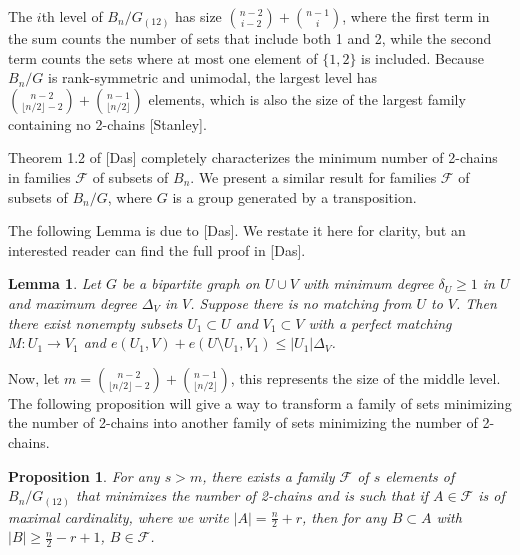 \documentclass[12pt]{article}
\theoremstyle{plain}
\newtheorem{lemma}[theorem]{Lemma}
\newtheorem{proposition}[theorem]{Proposition}
\theoremstyle{definition}
\theoremstyle{remark}
\newcommand{\F}{\mathcal{F}}
\begin{document}
The $i$th level of $B_n / G_{(12)}$ has size $\binom{n-2}{i-2} + \binom{n-1}{i}$, where the first term in the sum counts the number of sets that include both 1 and 2, while the second term counts the sets where at most one element of $\{1,2\}$ is included. Because $B_n / G$ is rank-symmetric and unimodal, the largest level has $\binom{n-2}{\lfloor n/2 \rfloor -2} + \binom{n-1}{\lfloor n/2 \rfloor}$ elements, which is also the size of the largest family containing no 2-chains [Stanley].


Theorem 1.2 of [Das] completely characterizes the minimum number of 2-chains in families $\F$ of subsets of $B_n$. We present a similar result for families $\F$ of subsets of $B_n / G$, where $G$ is a group generated by a transposition.


The following Lemma is due to [Das]. We restate it here for clarity, but an interested reader can find the full proof in [Das].

\begin{lemma}
\label{lemma2}
Let $G$ be a bipartite graph on $U \cup V$ with minimum degree $\delta_U \geq 1$ in $U$ and maximum degree $\Delta_V$ in $V$. Suppose there is no matching from $U$ to $V$. Then there exist nonempty subsets $U_1 \subset U$ and $V_1 \subset V$ with a perfect matching $M: U_1 \to V_1$ and $e(U_1,V) + e(U \setminus U_1,V_1) \leq |U_1| \Delta_V$.
\end{lemma}

Now, let $m = \binom{n-2}{\lfloor n/2 \rfloor -2} + \binom{n-1}{\lfloor n/2 \rfloor}$, this represents the size of the middle level. The following proposition will give a way to transform a family of sets minimizing the number of 2-chains into another family of sets minimizing the number of 2-chains. 

\begin{proposition}
\label{proposition1} For any $s > m$, there exists a family $\F$ of $s$ elements of $B_n / G_{(12)}$ that minimizes the number of 2-chains and is such that if $A \in \F$ is of maximal cardinality, where we write $|A| = \frac{n}{2}+r$, then for any $B \subset A$ with $|B| \geq \frac{n}{2} - r + 1$, $B \in \F$.
\end{proposition}
\end{document}
